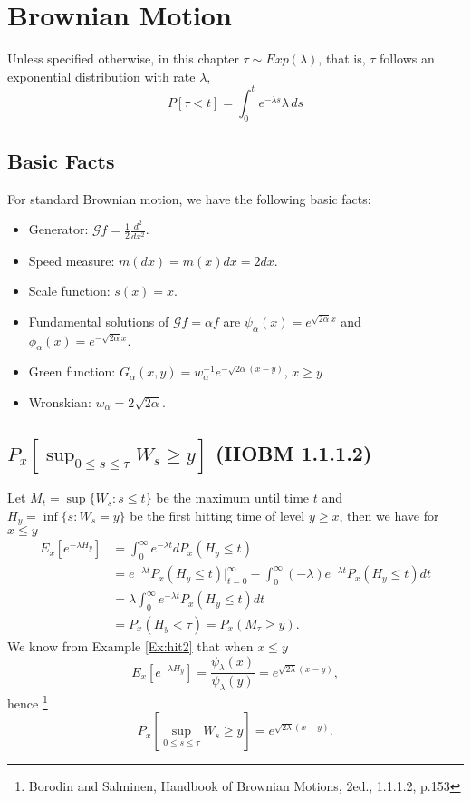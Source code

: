 \chapter{Brownian Motion}

Unless specified otherwise, in this chapter $\tau \sim Exp(\lambda)$, that is,
$\tau$ follows an exponential distribution with rate $\lambda$,
\[
  P[\tau<t] = \int_0^t e^{-\lambda s} \lambda \, ds
\]

\section{Basic Facts}
For standard Brownian motion, we have the following basic facts:
\begin{itemize}
  \item Generator: $\mathcal{G} f = \frac{1}{2} \frac{d^2}{dx^2}$.
  \item Speed measure: $m(dx)=m(x)dx=2 dx$.
  \item Scale function: $s(x)=x$.
  \item Fundamental solutions of $\mathcal{G} f = \alpha f$ are
    $\psi_{\alpha}(x)=e^{\sqrt{2\alpha} x}$ and
    $\phi_{\alpha}(x)=e^{-\sqrt{2\alpha} x}$.
  \item Green function: $G_{\alpha}(x,y)=w_{\alpha}^{-1} e^{-\sqrt{2\alpha}(x-y)}$, 
	$x\ge y$
  \item Wronskian: $w_{\alpha}=2\sqrt{2\alpha}$.
\end{itemize}

\section{ $P_x[ \sup_{0\le s\le \tau} W_s \ge y ]$ (HOBM 1.1.1.2) }
Let $M_t = \sup\{W_s: s\le t \}$ be the maximum until time $t$ and 
$H_y=\inf\{s:W_s=y \}$ be the first hitting time of level $y\ge x$,
then we have for $x\le y$
\begin{align*}
	E_x[e^{-\lambda H_y}] 
	&= \int_0^{\infty} e^{-\lambda t} dP_x(H_y\le t)  \\
	&= e^{-\lambda t} P_x(H_y\le t) |_{t=0}^{\infty} 
	   - \int_0^{\infty} (-\lambda) e^{-\lambda t} P_x(H_y\le t) dt  \\
	&= \lambda \int_0^{\infty} e^{-\lambda t} P_x(H_y\le t) dt  \\
	&= P_x(H_y<\tau) = P_x(M_{\tau}\ge y).
\end{align*}
We know from Example \ref{Ex:hit2} that when $x\le y$
\[
  E_x[e^{-\lambda H_y}]
    =\frac{\psi_{\lambda}(x)}{\psi_{\lambda}(y)}
    = e^{\sqrt{2\lambda}(x-y)},
\]
hence
\footnote{Borodin and Salminen, Handbook of Brownian Motions, 2ed., 1.1.1.2,
p.153}
\begin{equation} \label{E:HOBM1.1.1.2}
  P_x[ \sup_{0\le s\le \tau} W_s \ge y ] = e^{\sqrt{2\lambda}(x-y)}.
\end{equation}

